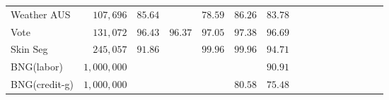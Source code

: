 \begin{table}[!t]
\begin{tabular}{lrrrrrrrrrrrrrrr}
		\multirow{1}{*}{Weather AUS} & \multirow{1}{*}{ $ 107,696 $ }  &
		$ 85.64 $  & \textemdash &  $ 78.59 $  &  $ \mathbf{86.26} $  &  $ 83.78 $  \\
		\multirow{1}{*}{Vote} & \multirow{1}{*}{ $ 131,072 $ }  &
		$ 96.43 $  &  $ 96.37 $  &  $ 97.05 $  &  $ \mathbf{97.38} $  &  $ 96.69 $  \\
		\multirow{1}{*}{Skin Seg} & \multirow{1}{*}{ $ 245,057 $ }  &
		$ 91.86 $  & \textemdash &  $ \mathbf{99.96} $  &  $ \mathbf{99.96} $  &  $ 94.71 $  \\
		\multirow{1}{*}{BNG(labor)} & \multirow{1}{*}{ $ 1,000,000 $ }  &
		\textemdash & \textemdash & \textemdash & \textemdash &  $ \mathbf{90.91} $  \\
		\multirow{1}{*}{BNG(credit-g)} & \multirow{1}{*}{ $ 1,000,000 $ }  &
		\textemdash & \textemdash & \textemdash &  $ \mathbf{80.58} $  &  $ 75.48 $  \\
		\bottomrule
		
		
		
	\end{tabular}
	
\end{table}


